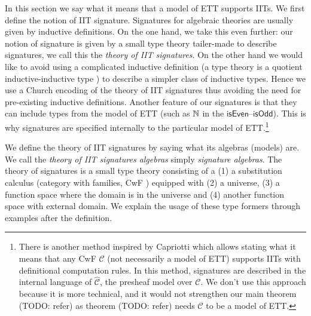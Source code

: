 \documentclass[a4paper,UKenglish,cleveref, autoref]{lipics-v2019}
\begin{document}
In this section we say what it means that a model of ETT supports
IITs. We first define the notion of IIT signature. Signatures for
algebraic theories are usually given by inductive definitions. On the
one hand, we take this even further: our notion of signature is given
by a small type theory tailer-made to describe signatures, we call
this the \emph{theory of IIT signatures}. On the other hand we would
like to avoid using a complicated inductive definition (a type theory
is a quotient inductive-inductive type \cite{ttintt}) to describe a
simpler class of inductive types. Hence we use a Church encoding
\cite{DBLP:conf/lics/AwodeyFS18} of the theory of IIT signatures thus
avoiding the need for pre-existing inductive definitions. Another
feature of our signatures is that they can include types from the
model of ETT (such as $\mathbb{N}$ in the
$\mathsf{isEven}$--$\mathsf{isOdd}$). This is why signatures are
specified internally to the particular model of ETT.\footnote{There is
  another method inspired by Capriotti \cite{paolo} which allows
  stating what it means that any CwF $\mathcal{C}$ (not necessarily a
  model of ETT) supports IITs with definitional computation rules. In
  this method, signatures are described in the internal language of
  $\hat{\mathcal{C}}$, the presheaf model over $\mathcal{C}$. We don't
  use this approach because it is more technical, and it would not
  strengthen our main theorem (TODO: refer) as theorem (TODO: refer)
  needs $\mathcal{C}$ to be a model of ETT.}

We define the theory of IIT signatures by saying what its algebras
(models) are. We call the \emph{theory of IIT signatures algebras}
simply \emph{signature algebras}. The theory of signatures is a small
type theory consisting of a (1) a substitution calculus (category with
families, CwF \cite{Dybjer96internaltype}) equipped with (2) a
universe, (3) a function space where the domain is in the universe and
(4) another function space with external domain. We explain the usage
of these type formers through examples after the definition.
\end{document}
